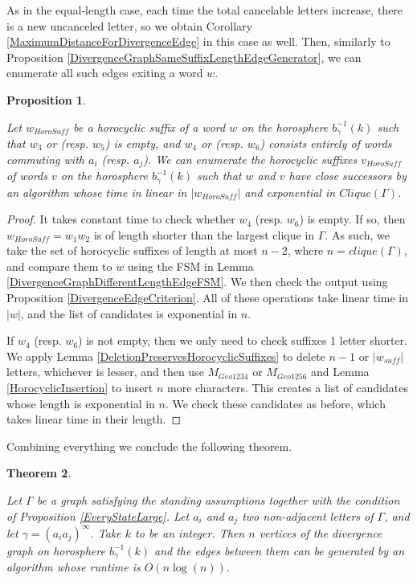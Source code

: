 \documentclass[10pt,a4paper]{amsart}
\newtheorem{theorem}{Theorem}[subsection]
\newtheorem{proposition}[theorem]{Proposition}
\theoremstyle{definition}
\theoremstyle{remark}
\begin{document}
	As in the equal-length case, each time the total cancelable letters increase, there is a new uncanceled letter, so we obtain Corollary \ref{MaximumDistanceForDivergenceEdge} in this case as well. Then, similarly to Proposition \ref{DivergenceGraphSameSuffixLengthEdgeGenerator}, we can enumerate all such edges exiting a word $w$.
	
	\begin{proposition}\label{DivergenceGraphDifferentSuffixLengthEdgeGenerator}
		
		Let $w_{HoroSuff}$ be a horocyclic suffix of a word $w$ on the horosphere $b_{\gamma}^{-1}(k)$ such that $w_3$ or (resp. $w_5$) is empty, and $w_4$ or (resp. $w_6$) consists entirely of words commuting with $a_i$ (resp. $a_j$). We can enumerate the horocyclic suffixes $v_{HoroSuff}$ of words $v$ on the horosphere $b_{\gamma}^{-1}(k)$ such that $w$ and $v$ have close successors by an algorithm whose time in linear in $|w_{HoroSuff}|$ and exponential in $Clique(\Gamma)$.
		
	\end{proposition}
	
	\begin{proof}
		
		It takes constant time to check whether $w_4$ (resp. $w_6$) is empty. If so, then $w_{HoroSuff}=w_1w_2$ is of length shorter than the largest clique in $\Gamma$. As such, we take the set of horocyclic suffixes of length at most $n-2$, where $n=clique(\Gamma)$, and compare them to $w$ using the FSM in Lemma \ref{DivergenceGraphDifferentLengthEdgeFSM}. We then check the output using Proposition \ref{DivergenceEdgeCriterion}. All of these operations take linear time in $|w|$, and the list of candidates is exponential in $n$.
		
		If $w_4$ (resp. $w_6$) is not empty, then we only need to check suffixes 1 letter shorter. We apply Lemma \ref{DeletionPreservesHorocyclicSuffixes} to delete $n-1$ or $|w_{suff}|$ letters, whichever is lesser, and then use $M_{Geo1234}$ or $M_{Geo1256}$ and Lemma \ref{HorocyclicInsertion} to insert $n$ more characters. This creates a list of candidates whose length is exponential in $n$. We check these candidates as before, which takes linear time in their length.
	\end{proof}
	
	Combining everything we conclude the following theorem.
	
	\begin{theorem} \label{DivergenceGraphGenerationSpeed}
		
		Let $\Gamma$ be a graph satisfying the standing assumptions together with the condition of Proposition \ref{EveryStateLarge}. Let $a_i$ and $a_j$ two non-adjacent letters of $\Gamma$, and let \newline $\gamma=(a_ia_j)^\infty$. Take $k$ to be an integer. Then $n$ vertices of the divergence graph on horosphere $b_\gamma^{-1}(k)$ and the edges between them can be generated by an algorithm whose runtime is $O(n\log(n))$.
	\end{theorem}
	
\end{document}
